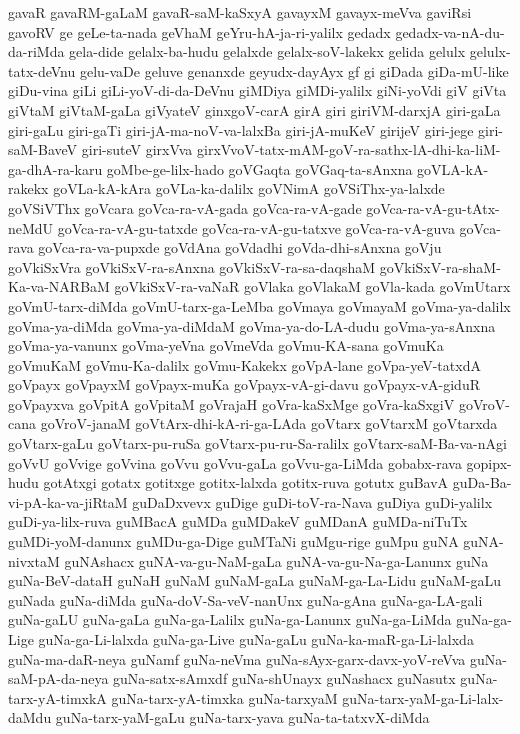 {gavaR
gavaRM-gaLaM
gavaR-saM-kaSxyA
gavayxM
gavayx-meVva
gaviRsi
gavoRV
ge
geLe-ta-nada
geVhaM
geYru-hA-ja-ri-yalilx
gedadx
gedadx-va-nA-du-da-riMda
gela-dide
gelalx-ba-hudu
gelalxde
gelalx-soV-lakekx
gelida
gelulx
gelulx-tatx-deVnu
gelu-vaDe
geluve
genanxde
geyudx-dayAyx
gf
gi
giDada
giDa-mU-like
giDu-vina
giLi
giLi-yoV-di-da-DeVnu
giMDiya
giMDi-yalilx
giNi-yoVdi
giV
giVta
giVtaM
giVtaM-gaLa
giVyateV
ginxgoV-carA
girA
giri
giriVM-darxjA
giri-gaLa
giri-gaLu
giri-gaTi
giri-jA-ma-noV-va-lalxBa
giri-jA-muKeV
girijeV
giri-jege
giri-saM-BaveV
giri-suteV
girxVva
girxVvoV-tatx-mAM-goV-ra-sathx-lA-dhi-ka-liM-ga-dhA-ra-karu
goMbe-ge-lilx-hado
goVGaqta
goVGaq-ta-sAnxna
goVLA-kA-rakekx
goVLa-kA-kAra
goVLa-ka-dalilx
goVNimA
goVSiThx-ya-lalxde
goVSiVThx
goVcara
goVca-ra-vA-gada
goVca-ra-vA-gade
goVca-ra-vA-gu-tAtx-neMdU
goVca-ra-vA-gu-tatxde
goVca-ra-vA-gu-tatxve
goVca-ra-vA-guva
goVca-rava
goVca-ra-va-pupxde
goVdAna
goVdadhi
goVda-dhi-sAnxna
goVju
goVkiSxVra
goVkiSxV-ra-sAnxna
goVkiSxV-ra-sa-daqshaM
goVkiSxV-ra-shaM-Ka-va-NARBaM
goVkiSxV-ra-vaNaR
goVlaka
goVlakaM
goVla-kada
goVmUtarx
goVmU-tarx-diMda
goVmU-tarx-ga-LeMba
goVmaya
goVmayaM
goVma-ya-dalilx
goVma-ya-diMda
goVma-ya-diMdaM
goVma-ya-do-LA-dudu
goVma-ya-sAnxna
goVma-ya-vanunx
goVma-yeVna
goVmeVda
goVmu-KA-sana
goVmuKa
goVmuKaM
goVmu-Ka-dalilx
goVmu-Kakekx
goVpA-lane
goVpa-yeV-tatxdA
goVpayx
goVpayxM
goVpayx-muKa
goVpayx-vA-gi-davu
goVpayx-vA-giduR
goVpayxva
goVpitA
goVpitaM
goVrajaH
goVra-kaSxMge
goVra-kaSxgiV
goVroV-cana
goVroV-janaM
goVtArx-dhi-kA-ri-ga-LAda
goVtarx
goVtarxM
goVtarxda
goVtarx-gaLu
goVtarx-pu-ruSa
goVtarx-pu-ru-Sa-ralilx
goVtarx-saM-Ba-va-nAgi
goVvU
goVvige
goVvina
goVvu
goVvu-gaLa
goVvu-ga-LiMda
gobabx-rava
gopipx-hudu
gotAtxgi
gotatx
gotitxge
gotitx-lalxda
gotitx-ruva
gotutx
guBavA
guDa-Ba-vi-pA-ka-va-jiRtaM
guDaDxvevx
guDige
guDi-toV-ra-Nava
guDiya
guDi-yalilx
guDi-ya-lilx-ruva
guMBacA
guMDa
guMDakeV
guMDanA
guMDa-niTuTx
guMDi-yoM-danunx
guMDu-ga-Dige
guMTaNi
guMgu-rige
guMpu
guNA
guNA-nivxtaM
guNAshacx
guNA-va-gu-NaM-gaLa
guNA-va-gu-Na-ga-Lanunx
guNa
guNa-BeV-dataH
guNaH
guNaM
guNaM-gaLa
guNaM-ga-La-Lidu
guNaM-gaLu
guNada
guNa-diMda
guNa-doV-Sa-veV-nanUnx
guNa-gAna
guNa-ga-LA-gali
guNa-gaLU
guNa-gaLa
guNa-ga-Lalilx
guNa-ga-Lanunx
guNa-ga-LiMda
guNa-ga-Lige
guNa-ga-Li-lalxda
guNa-ga-Live
guNa-gaLu
guNa-ka-maR-ga-Li-lalxda
guNa-ma-daR-neya
guNamf
guNa-neVma
guNa-sAyx-garx-davx-yoV-reVva
guNa-saM-pA-da-neya
guNa-satx-sAmxdf
guNa-shUnayx
guNashacx
guNasutx
guNa-tarx-yA-timxkA
guNa-tarx-yA-timxka
guNa-tarxyaM
guNa-tarx-yaM-ga-Li-lalx-daMdu
guNa-tarx-yaM-gaLu
guNa-tarx-yava
guNa-ta-tatxvX-diMda
}
